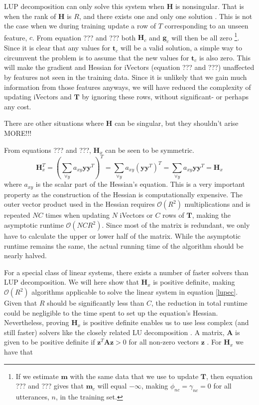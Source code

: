 LUP decomposition can only solve this system when $\mathbf{H}$ is nonsingular. That is when the rank of $\mathbf{H}$ is $R$, and there exists one and only one solution \cite[p. 54]{matte3}. This is not the case when we during training update a row of $T$ corresponding to an unseen feature, $c$. From equation ??? and ??? both $\mathbf{H}_c$ and $\mathbf{g}_c$ will then be all zero \footnote{If we estimate $\mathbf{m}$ with the same data that we use to update $\mathbf{T}$, then equation ??? and ??? gives that $\mathbf{m}_c$ will equal $-\infty$, making $\phi_{nc}=\gamma_{nc}=0$ for all utterances, $n$, in the training set.}. Since it is clear that any values for $\mathbf{t}_c$ will be a valid solution, a simple way to circumvent the problem is to assume that the new values for $\mathbf{t}_c$ is also zero. This will make the gradient and Hessian for iVectors (equation ??? and ???) unaffected by features not seen in the training data. Since it is unlikely that we gain much information  from those features anyways, we will have reduced the complexity of updating iVectors and $\mathbf{T}$ by ignoring these rows, without significant- or perhaps any cost.

There are other situations where $\mathbf{H}$ can be singular, but they shouldn't arise MORE!!!


From equations ??? and ???, $\mathbf{H}_x$ can be seen to be symmetric.
\begin{equation}\label{symproof}
\mathbf{H}_x^T = \left(\sum_{\forall y}a_{xy}\mathbf{y}\mathbf{y}^T\right)^T = 
\sum_{\forall y}a_{xy}\left(\mathbf{y}\mathbf{y}^T\right)^T =
 \sum_{\forall y}a_{xy}\mathbf{y}\mathbf{y}^T = \mathbf{H}_x
\end{equation}
where $a_{xy}$ is the scalar part of the Hessian's equation. This is a very important property as the construction of the Hessian is computationally expensive. The outer vector product used in the Hessian requires $\mathcal{O}(R^2)$ multiplications and is repeated $NC$ times when updating $N$ iVectors or $C$ rows of $\mathbf{T}$, making the asymptotic runtime $\mathcal{O}(NCR^2)$.  Since most of the matrix is redundant, we only have to calculate the upper or lower half of the matrix. While the asymptotic runtime remains the same, the actual running time of the algorithm should be nearly halved.

For a special class of linear systems, there exists a number of faster solvers than LUP decomposition. We will here show that $\mathbf{H}_x$ is positive definite, making $\mathcal{O}(R^2)$ algorithms applicable \cite{tewfik1994fast} to solve the linear system in equation \ref{lupec}. Given that $R$ should be significantly less than $C$, the reduction in total runtime could be negligible to the time spent to set up the equation's Hessian. Nevertheless, proving $\mathbf{H}_x$ is positive definite enables us to use less complex (and still faster) solvers like the closely related LU decomposition \cite[p. 749]{cormen}. A matrix, $\mathbf{A}$ is given to be positive definite if $\mathbf{z}^T\mathbf{Az} > 0$ for all non-zero vectors $\mathbf{z}$ \cite[p. 246]{matte3}. For $\mathbf{H}_x$ we have that


